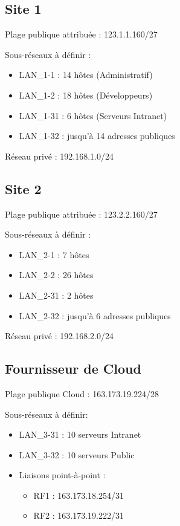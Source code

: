 \documentclass[11pt,a4paper]{memoir}%
\begin{document}
		\subsection{Site 1}
		
			Plage publique attribuée : 123.1.1.160/27
		
			Sous-réseaux à définir :
		
		\begin{itemize}
			\item LAN\_1-1 : 14  hôtes (Administratif)
			\item LAN\_1-2 : 18  hôtes (Développeurs)
			\item LAN\_1-31 : 6  hôtes (Serveurs Intranet)
			\item LAN\_1-32 : jusqu’à 14 adresses publiques
		\end{itemize}
		
			Réseau privé : 192.168.1.0/24
		
		\subsection{Site 2}
		
			Plage publique attribuée : 123.2.2.160/27
		
			Sous-réseaux à définir :
		
		\begin{itemize}
			\item LAN\_2-1 : 7  hôtes
			\item LAN\_2-2 : 26  hôtes
			\item LAN\_2-31 : 2 hôtes
			\item LAN\_2-32 : jusqu’à 6 adresses publiques
		\end{itemize}
		
			Réseau privé :  192.168.2.0/24
		
		\subsection{Fournisseur de Cloud}
		
			Plage publique Cloud : 163.173.19.224/28
		
			Sous-réseaux à définir:
		
		\begin{itemize}
			\item LAN\_3-31 : 10 serveurs Intranet
			\item LAN\_3-32 : 10 serveurs Public
			\item Liaisons point-à-point :
			\begin{itemize}
				\item RF1 : 163.173.18.254/31
				\item RF2 : 163.173.19.222/31
			\end{itemize}
		\end{itemize}
		
\end{document}

